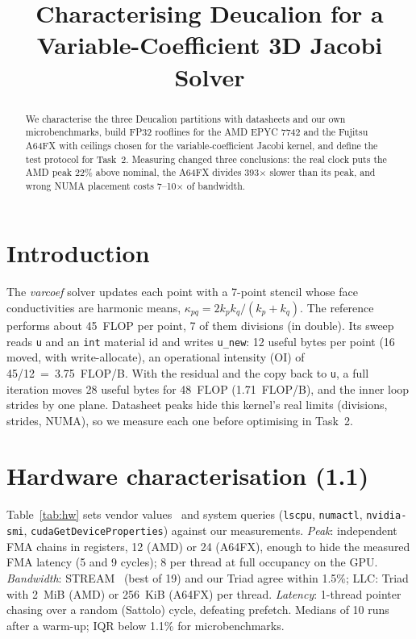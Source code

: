 \documentclass[conference,10pt]{IEEEtran}
\begin{document}
\title{Characterising Deucalion for a Variable-Coefficient 3D Jacobi Solver}
\author{
}
\maketitle

\begin{abstract}
We characterise the three Deucalion partitions with datasheets and our own microbenchmarks, build
FP32 rooflines for the AMD EPYC 7742 and the Fujitsu A64FX with ceilings chosen for the
variable-coefficient Jacobi kernel, and define the test protocol for Task~2. Measuring changed
three conclusions: the real clock puts the AMD peak 22\% above nominal, the A64FX divides
393$\times$ slower than its peak, and wrong NUMA placement costs 7--10$\times$ of bandwidth.
\end{abstract}

\section{Introduction}
The \emph{varcoef} solver updates each point with a 7-point stencil whose face conductivities are
harmonic means, $\kappa_{pq}=2k_pk_q/(k_p+k_q)$. The reference performs about 45~FLOP per point,
7 of them divisions (in double). Its sweep reads \texttt{u} and an \texttt{int} material id and
writes \texttt{u\_new}: 12 useful bytes per point (16 moved, with write-allocate), an operational
intensity (OI) of 45/12~=~3.75~FLOP/B. With the residual and the copy back to \texttt{u}, a full
iteration moves 28 useful bytes for 48~FLOP (1.71~FLOP/B), and the inner loop strides by one plane.
Datasheet peaks hide this kernel's real limits (divisions, strides, NUMA), so we measure each one
before optimising in Task~2.

\section{Hardware characterisation (1.1)}
Table~\ref{tab:hw} sets vendor values~\cite{amd56305,a64fx,a100} and system queries
(\texttt{lscpu}, \texttt{numactl}, \texttt{nvidia-smi}, \texttt{cudaGetDeviceProperties}) against
our measurements. \emph{Peak}: independent FMA chains in registers, 12 (AMD) or 24 (A64FX), enough to
hide the measured FMA latency (5 and 9 cycles); 8 per thread at full occupancy on the GPU.
\emph{Bandwidth}: STREAM~\cite{stream} (best of 19) and our Triad agree within 1.5\%; LLC: Triad
with 2~MiB (AMD) or 256~KiB (A64FX) per thread. \emph{Latency}: 1-thread pointer chasing over a
random (Sattolo) cycle, defeating prefetch. Medians of 10 runs after a warm-up;
IQR below 1.1\% for microbenchmarks.
\end{document}
